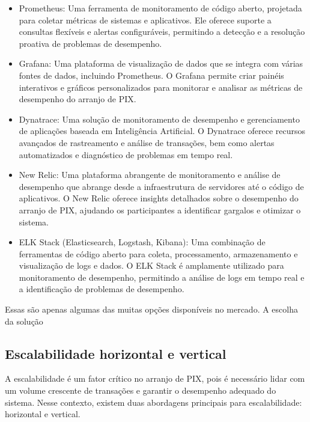 \documentclass[12pt]{article}
\begin{document}
\begin{itemize}

  \item Prometheus: Uma ferramenta de monitoramento de código aberto, projetada para coletar métricas de sistemas e aplicativos. Ele oferece suporte a consultas flexíveis e alertas configuráveis, permitindo a detecção e a resolução proativa de problemas de desempenho.

  \item Grafana: Uma plataforma de visualização de dados que se integra com várias fontes de dados, incluindo Prometheus. O Grafana permite criar painéis interativos e gráficos personalizados para monitorar e analisar as métricas de desempenho do arranjo de PIX.

  \item Dynatrace: Uma solução de monitoramento de desempenho e gerenciamento de aplicações baseada em Inteligência Artificial. O Dynatrace oferece recursos avançados de rastreamento e análise de transações, bem como alertas automatizados e diagnóstico de problemas em tempo real.

  \item New Relic: Uma plataforma abrangente de monitoramento e análise de desempenho que abrange desde a infraestrutura de servidores até o código de aplicativos. O New Relic oferece insights detalhados sobre o desempenho do arranjo de PIX, ajudando os participantes a identificar gargalos e otimizar o sistema.

  \item ELK Stack (Elasticsearch, Logstash, Kibana): Uma combinação de ferramentas de código aberto para coleta, processamento, armazenamento e visualização de logs e dados. O ELK Stack é amplamente utilizado para monitoramento de desempenho, permitindo a análise de logs em tempo real e a identificação de problemas de desempenho.

\end{itemize}

Essas são apenas algumas das muitas opções disponíveis no mercado. A escolha da solução

\subsection{Escalabilidade horizontal e vertical} \label{sec:tecnologia}

A escalabilidade é um fator crítico no arranjo de PIX, pois é necessário lidar com um volume crescente de transações e garantir o desempenho adequado do sistema. Nesse contexto, existem duas abordagens principais para escalabilidade: horizontal e vertical.
\end{document}
